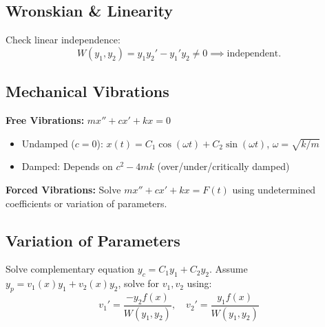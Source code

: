 \begin{multicols}{2}
\subsection*{Wronskian \& Linearity}
Check linear independence: 
\[
W(y_1, y_2) = y_1y_2' - y_1'y_2 \neq 0 \implies \text{independent}.
\]

\subsection*{Mechanical Vibrations}
\textbf{Free Vibrations:} \( mx'' + cx' + kx = 0 \)
\begin{itemize}
    \item Undamped (\( c = 0 \)): \( x(t) = C_1 \cos(\omega t) + C_2 \sin(\omega t) \), \( \omega = \sqrt{k/m} \)
    \item Damped: Depends on \( c^2 - 4mk \) (over/under/critically damped)
\end{itemize}

\textbf{Forced Vibrations:} Solve \( mx'' + cx' + kx = F(t) \) using undetermined coefficients or variation of parameters.

\subsection*{Variation of Parameters}
Solve complementary equation \( y_c = C_1y_1 + C_2y_2 \). Assume \( y_p = v_1(x)y_1 + v_2(x)y_2 \), solve for \( v_1, v_2 \) using:
\[
v_1' = \frac{-y_2 f(x)}{W(y_1, y_2)}, \quad v_2' = \frac{y_1 f(x)}{W(y_1, y_2)}
\]

\end{multicols}

